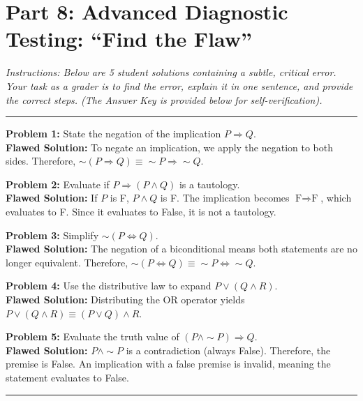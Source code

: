 \documentclass{article}
\begin{document}
\newpage
\section*{Part 8: Advanced Diagnostic Testing: ``Find the Flaw''}

\textit{Instructions: Below are 5 student solutions containing a subtle, critical error. Your task as a grader is to find the error, explain it in one sentence, and provide the correct steps. (The Answer Key is provided below for self-verification).}

\vspace{1em}
\hrule
\vspace{1em}
\textbf{Problem 1:} State the negation of the implication $P \Rightarrow Q$. \\
\textbf{Flawed Solution:} To negate an implication, we apply the negation to both sides. Therefore, $\sim(P \Rightarrow Q) \equiv \sim P \Rightarrow \sim Q$.

\vspace{1em}
\textbf{Problem 2:} Evaluate if $P \Rightarrow (P \land Q)$ is a tautology. \\
\textbf{Flawed Solution:} 
If $P$ is F, $P \land Q$ is F. The implication becomes $\text{F} \Rightarrow \text{F}$, which evaluates to F. Since it evaluates to False, it is not a tautology. 

\vspace{1em}
\textbf{Problem 3:} Simplify $\sim(P \Leftrightarrow Q)$. \\
\textbf{Flawed Solution:} The negation of a biconditional means both statements are no longer equivalent. Therefore, $\sim(P \Leftrightarrow Q) \equiv \sim P \Leftrightarrow \sim Q$. 

\vspace{1em}
\textbf{Problem 4:} Use the distributive law to expand $P \lor (Q \land R)$. \\
\textbf{Flawed Solution:} Distributing the OR operator yields $P \lor (Q \land R) \equiv (P \lor Q) \land R$. 

\vspace{1em}
\textbf{Problem 5:} Evaluate the truth value of $(P \land \sim P) \Rightarrow Q$. \\
\textbf{Flawed Solution:} $P \land \sim P$ is a contradiction (always False). Therefore, the premise is False. An implication with a false premise is invalid, meaning the statement evaluates to False. 

\vspace{1em}
\hrule
\vspace{1em}
\end{document}
